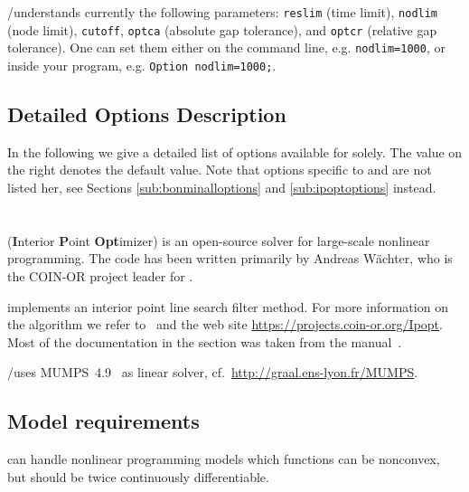 \MYGAMS/\COUENNE understands currently the following \MYGAMS parameters: \texttt{reslim} (time limit), \texttt{nodlim} (node limit), \texttt{cutoff}, \texttt{optca} (absolute gap tolerance), and \texttt{optcr} (relative gap tolerance).
One can set them either on the command line, e.g. \verb+nodlim=1000+, or inside your \MYGAMS program, e.g. \verb+Option nodlim=1000;+.

\subsection{Detailed Options Description}
\label{sub:couenneoptions}

In the following we give a detailed list of options available for \COUENNE solely.
The value on the right denotes the default value.
Note that options specific to \IPOPT and \BONMIN are not listed her, see Sections \ref{sub:bonminalloptions} and \ref{sub:ipoptoptions} instead.



\section{\IPOPT}


\IPOPT (\textbf{I}nterior \textbf{P}oint \textbf{Opt}imizer) is an open-source solver for large-scale nonlinear programming.
The code has been written primarily by Andreas W\"achter, who is the COIN-OR project leader for \IPOPT.

\IPOPT implements an interior point line search filter method.
For more information on the algorithm we refer to~\cite{Waechter2002,WaBi06} and the \IPOPT web site \url{https://projects.coin-or.org/Ipopt}.
Most of the \IPOPT documentation in the section was taken from the \IPOPT manual~\cite{IpoptManual}.

\MYGAMS/\IPOPT uses \textsc{MUMPS}~4.9~\cite{AmestoyDuffKosterLExcellent2001,AmestoyGuermoucheLExcellentPralet2006} as linear solver, cf.~\url{http://graal.ens-lyon.fr/MUMPS}.

\subsection{Model requirements}

\IPOPT can handle nonlinear programming models which functions can be nonconvex, but should be twice continuously differentiable.

